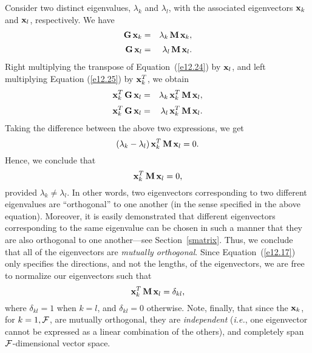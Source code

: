Consider two distinct eigenvalues, $\lambda_k$ and $\lambda_l$, with
the associated eigenvectors ${\bf x}_k$ and ${\bf x}_l$, respectively. 
We have
\begin{eqnarray}\label{e12.24}
{\bf G}\,{\bf x}_k &=& \lambda_k\,{\bf M}\,{\bf x}_k,\\[0.5ex]
{\bf G}\,{\bf x}_l &=& \lambda_l\,{\bf M}\,{\bf x}_l.\label{e12.25}
\end{eqnarray}
Right multiplying the transpose of Equation~(\ref{e12.24}) by ${\bf x}_l$,
and left multiplying Equation (\ref{e12.25}) by ${\bf x}_k^T$, we obtain
\begin{eqnarray}
{\bf x}_k^T\,{\bf G}\,{\bf x}_l&=& \lambda_k\,{\bf x}_k^T\,{\bf M}\,{\bf x}_l,\\[0.5ex]
{\bf x}_k^T\,{\bf G}\,{\bf x}_l &=& \lambda_l\,{\bf x}_k^T\,{\bf M}\,{\bf x}_l.
\end{eqnarray}
Taking the difference between the above two expressions, we get
\begin{equation}
(\lambda_k-\lambda_l)\,{\bf x}_k^T\,{\bf M}\,{\bf x}_l = 0.
\end{equation}
Hence, we conclude that
\begin{equation}
{\bf x}_k^T\,{\bf M}\,{\bf x}_l = 0,
\end{equation}
provided $\lambda_k\neq \lambda_l$. 
In other words, two eigenvectors corresponding to two different eigenvalues
are ``orthogonal'' to one another (in the sense specified in the above equation).
Moreover, it is easily demonstrated that different eigenvectors corresponding to the same
eigenvalue can be chosen in such a manner that they are also orthogonal to one another---see Section~\ref{smatrix}. Thus, we conclude
that all of the eigenvectors are {\em mutually orthogonal}. Since Equation~(\ref{e12.17}) only specifies the directions, and not the lengths, of the
eigenvectors, we are free to normalize our eigenvectors such that
\begin{equation}\label{e12.30}
{\bf x}_k^T\,{\bf M}\,{\bf x}_l = \delta_{kl},
\end{equation}
where $\delta_{kl}=1$ when $k=l$, and $\delta_{kl}=0$ otherwise. 
Note, finally, that since the ${\bf x}_k$, for $k=1,{\cal F}$, are mutually orthogonal,
they are {\em independent}\/ ({\em i.e.}, one eigenvector cannot be expressed as a linear combination of the others), and completely span ${\cal F}$-dimensional vector space.

